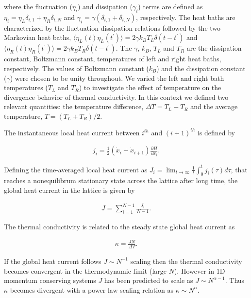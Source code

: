 \documentclass[aps,pre,reprint,groupedaddress]{revtex4-1}
\begin{document}
where the fluctuation ($\eta_i$) and dissipation ($\gamma_i$) terms are defined as $\eta_i=\eta_L\delta_{i,1}+\eta_R\delta_{i,N}$ and $\gamma_i=\gamma(\delta_{i,1}+\delta_{i,N})$, respectively. The heat baths are characterized by the fluctuation-dissipation relations followed by the two Markovian heat baths, $\langle \eta_L(t)\eta_L(t^\prime)\rangle=2\gamma k_BT_L\delta(t-t^\prime)$ and $\langle \eta_R(t)\eta_R(t^\prime)\rangle=2\gamma k_BT_R\delta(t-t^\prime)$. The $\gamma$, $k_B$, $T_L$ and $T_R$ are the dissipation constant, Boltzmann constant, temperatures of left and right heat baths, respectively. The values of Boltzmann constant ($k_B$) and the dissipation constant ($\gamma$) were chosen to be unity throughout. We varied the left and right bath temperatures ($T_L$ and $T_R$) to investigate the effect of temperature on the divergence behavior of thermal conductivity. In this context we defined two relevant quantities: the temperature difference, $\Delta T=T_L-T_R$ and the average temperature, $T=(T_L+T_R)/2$. 

The instantaneous local heat current between $i^{th}$ and $(i+1)^{th}$ is defined by 

\begin{eqnarray}
j_i=\frac{1}{2}(\dot{x}_i+\dot{x}_{i+1})\frac{\partial H}{\partial x_i} .
\label{eq4}
\end{eqnarray}

Defining the time-averaged local heat current as $J_i=\lim_{t\rightarrow\infty}\frac{1}{t}\int_{0}^{t}j_i(\tau)d\tau$, that reaches a nonequilibrum stationary state across the lattice after long time, the global heat current in the lattice is given by

\begin{eqnarray}
J=\sum_{i=1}^{N-1}\frac{J_i}{N-1} .
\label{eq5}
\end{eqnarray}

The thermal conductivity is related to the steady state global heat current as

\begin{eqnarray}
\kappa=\frac{JN}{\Delta T} .
\label{eq6}
\end{eqnarray}

If the global heat current follows $J\sim N^{-1}$ scaling then the thermal conductivity becomes convergent in the thermodynamic limit (large $N$). However in 1D momentum conserving systems $J$ has been predicted to scale as $J\sim N^{\alpha-1}$. Thus $\kappa$ becomes divergent with a power law scaling relation as $\kappa \sim N^\alpha$.  
\end{document}
